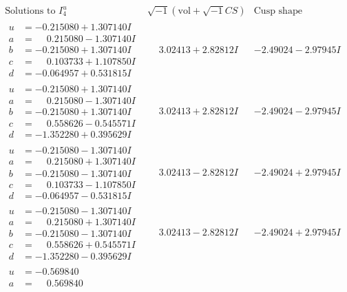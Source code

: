 \documentclass[1p]{elsarticle_modified}
\theoremstyle{definition}
\newcommand{\I}{\sqrt{-1}}
\begin{document}
$$\begin{array}{c|c|c}  
\text{Solutions to }I^u_{4}& \I (\text{vol} + \sqrt{-1}CS) & \text{Cusp shape}\\
 \hline 
\begin{aligned}
u &= -0.215080 + 1.307140 I \\
a &= \phantom{-}0.215080 - 1.307140 I \\
b &= -0.215080 + 1.307140 I \\
c &= \phantom{-}0.103733 + 1.107850 I \\
d &= -0.064957 + 0.531815 I\end{aligned}
 & \phantom{-}3.02413 + 2.82812 I & -2.49024 - 2.97945 I \\ \hline\begin{aligned}
u &= -0.215080 + 1.307140 I \\
a &= \phantom{-}0.215080 - 1.307140 I \\
b &= -0.215080 + 1.307140 I \\
c &= \phantom{-}0.558626 - 0.545571 I \\
d &= -1.352280 + 0.395629 I\end{aligned}
 & \phantom{-}3.02413 + 2.82812 I & -2.49024 - 2.97945 I \\ \hline\begin{aligned}
u &= -0.215080 - 1.307140 I \\
a &= \phantom{-}0.215080 + 1.307140 I \\
b &= -0.215080 - 1.307140 I \\
c &= \phantom{-}0.103733 - 1.107850 I \\
d &= -0.064957 - 0.531815 I\end{aligned}
 & \phantom{-}3.02413 - 2.82812 I & -2.49024 + 2.97945 I \\ \hline\begin{aligned}
u &= -0.215080 - 1.307140 I \\
a &= \phantom{-}0.215080 + 1.307140 I \\
b &= -0.215080 - 1.307140 I \\
c &= \phantom{-}0.558626 + 0.545571 I \\
d &= -1.352280 - 0.395629 I\end{aligned}
 & \phantom{-}3.02413 - 2.82812 I & -2.49024 + 2.97945 I \\ \hline\begin{aligned}
u &= -0.569840\phantom{ +0.000000I} \\
a &= \phantom{-}0.569840\phantom{ +0.000000I} \\

\end{aligned}
\end{array}$$
\end{document}
